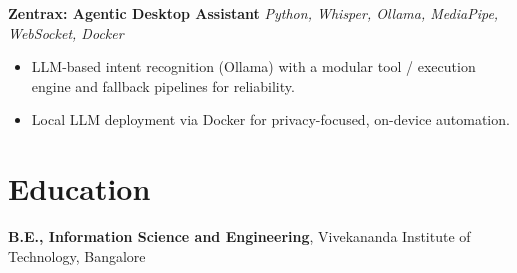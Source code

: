 \documentclass[10pt,a4paper]{article}
\begin{document}
\vspace{1pt}
\textbf{Zentrax: Agentic Desktop Assistant} \textit{Python, Whisper, Ollama, MediaPipe, WebSocket, Docker}
\begin{itemize}
  \item LLM-based intent recognition (Ollama) with a modular tool / execution engine and fallback pipelines for reliability.
  \item Local LLM deployment via Docker for privacy-focused, on-device automation.
\end{itemize}


\enlargethispage{2\baselineskip}
\section{Education}
\textbf{B.E., Information Science and Engineering},
Vivekananda Institute of Technology, Bangalore
\end{document}
